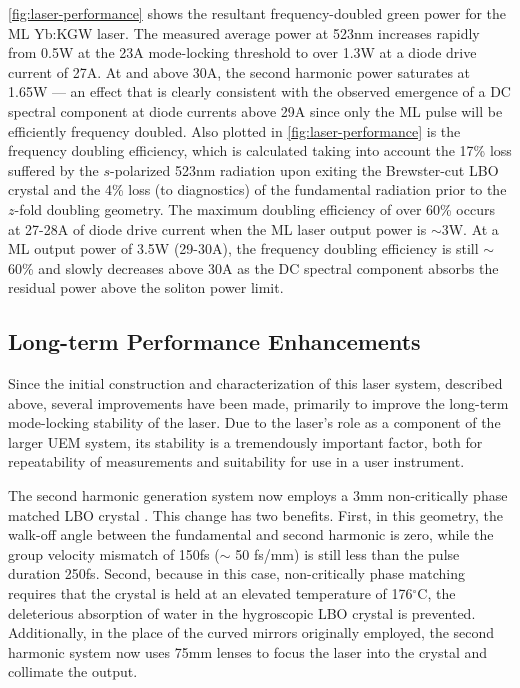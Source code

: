 \ref{fig:laser-performance} shows the resultant frequency-doubled green power for the ML Yb:KGW laser.
The measured average power at 523nm increases rapidly from 0.5W at the 23A mode-locking threshold to over 1.3W at a diode drive current of 27A.
At and above 30A, the second harmonic power saturates at 1.65W --- an effect that is clearly consistent with the observed emergence of a DC spectral component at diode currents above 29A since only the ML pulse will be efficiently frequency doubled.
Also plotted in \ref{fig:laser-performance} is the frequency doubling efficiency, which is calculated taking into account the 17\% loss suffered by the $s$-polarized 523nm radiation upon exiting the Brewster-cut LBO crystal and the 4\% loss (to diagnostics) of the fundamental radiation prior to the $z$-fold doubling geometry.
The maximum doubling efficiency of over 60\% occurs at 27-28A of diode drive current when the ML laser output power is $\sim$3W.
At a ML output power of 3.5W (29-30A), the frequency doubling efficiency is still $\sim$60\% and slowly decreases above 30A as the DC spectral component absorbs the residual power above the soliton power limit.

\subsection{Long-term Performance Enhancements}

Since the initial construction and characterization of this laser system, described above, several improvements have been made, primarily to improve the long-term mode-locking stability of the laser.
Due to the laser's role as a component of the larger UEM system, its stability is a tremendously important factor, both for repeatability of measurements and suitability for use in a user instrument.

The second harmonic generation system now employs a 3mm non-critically phase matched LBO crystal \cite{website_newlight}.
This change has two benefits. 
First, in this geometry, the walk-off angle between the fundamental and second harmonic is zero, while the group velocity mismatch of 150fs ($\sim$ 50 fs/mm) is still less than the pulse duration 250fs.
Second, because in this case, non-critically phase matching requires that the crystal is held at an elevated temperature of 176$^{\circ}$C, the deleterious absorption of water in the hygroscopic LBO crystal is prevented.
Additionally, in the place of the curved mirrors originally employed, the second harmonic system now uses 75mm lenses to focus the laser into the crystal and collimate the output.

